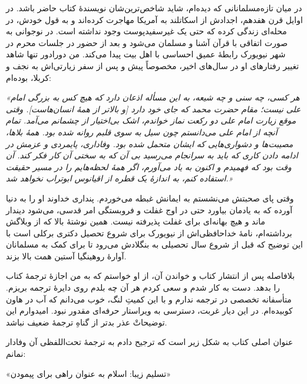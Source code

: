  {
	در میان تازه‌مسلمانانی که دیده‌ام، شاید شاخص‌ترین‌شان نویسندهٔ  کتاب  حاضر باشد.  در اوایل قرن هفدهم، اجدادش از اسکاتلند به آمریکا مهاجرت کرده‌اند و به قول خودش، در محله‌ای زندگی کرده که حتی یک غیرسفید‌پوست وجود نداشته است. در نوجوانی به صورت اتفاقی با قرآن آشنا و مسلمان می‌شود و بعد از حضور در جلسات محرم در شهر نیویورک رابطهٔ عمیق احساسی با اهل بیت {} پیدا می‌کند. من دورادور تنها شاهد تغییر رفتارهای او در سال‌های اخیر، مخصوصاً پیش و پس از سفر زیارتی‌اش به نجف و کربلا، بوده‌ام:
	
	\textit{
		«هر کسی، چه سنی و چه شیعه، به این مسأله اذعان دارد که هیچ کس به بزرگی امام علی{} نیست؛ مقام حضرت محمد{} که جای خود دارد [و بالاتر از همهٔ انسان‌هاست]. وقتی موقع زیارت امام علی{} دو رکعت نماز خواندم، اشک بی‌اختیار از چشمانم می‌آمد.  تمام آنچه از امام علی{} می‌دانستم چون سیل به سوی قلبم روانه شده بود. همهٔ بلاها، مصیبت‌ها و دشواری‌هایی که ایشان متحمل شده بود. وفاداری، پایمردی و عزمش در ادامه دادن کاری که باید به سرانجام می‌رسید بی آن که به سختی آن کار فکر کند. آن وقت بود که فهمیدم و اکنون به یاد می‌آورم، اگر همهٔ لحظه‌هایم را در مسیر حقیقت استفاده کنم، به اندازهٔ یک قطره از اقیانوس ابوتراب{} نخواهد شد.»}
	
	وقتی پای صحبتش می‌نشستم به ایمانش غبطه می‌خوردم. پنداری خداوند او را به دنیا آورده که به یادمان بیاورد حتی در اوج غفلت و فروبستگی امر قدسی، می‌شود دیندار ماند و هیچ بهانه‌ای برای غفلت پذیرفته نیست. همین نوشتهٔ بالا که از وبلاگش برداشته‌ام، نامهٔ خداحافظی‌اش از نیویورک برای شروع تحصیل دکتری برکلی است با این توضیح که قبل از شروع سال تحصیلی به بنگلادش می‌رود تا برای کمک به مسلمانان آوارهٔ روهینگیا آستین همت  بالا بزند.
	
	بلافاصله پس از انتشار کتاب و خواندن آن، از او خواستم که به من اجازهٔ ترجمهٔ کتاب را بدهد. دست به کار شدم و سعی کردم هر آن چه بلدم روی دایرهٔ ترجمه بریزم. متأسفانه  تخصصی در ترجمه ندارم و با این کمیتِ لنگ، خوب می‌دانم که آب در هاون کوبیده‌ام. در این دیار غربت، دسترسی به ویراستار حرفه‌ای مقدور نبود. امیدوارم این توضیحاتْ عذر بدتر از گناهِ ترجمهٔ ضعیف نباشد. 
	
	عنوان اصلی کتاب به شکل زیر است که ترجیح دادم به ترجمهٔ تحت‌اللفظی آن وفادار نمانم:
	\begin{center}
		{\small		{} }
		
		«تسلیم زیبا: اسلام به عنوان راهی برای پیمودن»
	\end{center}
	
}
